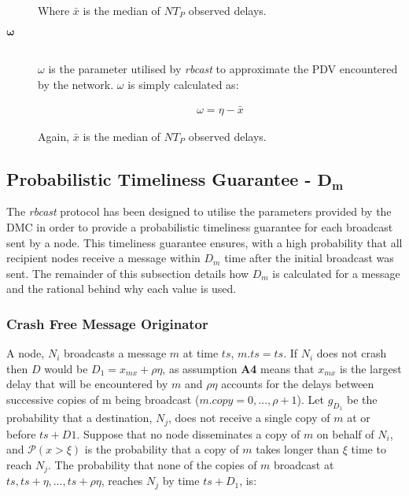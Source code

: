 \begin{description}
Where $\bar{x}$ is the median of $NT_P$ observed delays.

        \item[\Huge$\boldsymbol{\omega}$] \hfill \\
        $\omega$ is the parameter utilised by \emph{rbcast} to approximate the PDV encountered by the network.  $\omega$ is simply calculated as:
        
        \begin{equation*}
		    \begin{aligned}
		        \omega = \eta - \bar{x}
		    \end{aligned}
		\end{equation*}        
        
        Again, $\bar{x}$ is the median of $NT_P$ observed delays.
        \end{description}

        \subsection*{Probabilistic Timeliness Guarantee - $\boldsymbol{D_m}$}
        The \emph{rbcast} protocol has been designed to utilise the parameters provided by the DMC in order to provide a probabilistic timeliness guarantee for each broadcast sent by a node.  This timeliness guarantee ensures, with a high probability that all recipient nodes receive a message within $D_m$ time after the initial broadcast was sent.  The remainder of this subsection details how $D_m$ is calculated for a message and the rational behind why each value is used.  

        \subsubsection*{Crash Free Message Originator}
        A node, $N_i$ broadcasts a message $m$ at time $ts$, $m.ts = ts$.  If $N_i$ does not crash then $D$ would be $D_1 = x_{mx} + \rho\eta$, as assumption \textbf{A4} means that $x_{mx}$ is the largest delay that will be encountered by $m$ and $\rho\eta$ accounts for the delays between successive copies of m being broadcast ($m.copy = 0,\ldots,\rho+1$).  Let $g_{D_1}$ be the probability that a destination, $N_j$, does not receive a single copy of $m$ at or before $ts + D1$.  Suppose that no node disseminates a copy of $m$ on behalf of $N_i$, and $\mathcal{P}(x > \xi)$ is the probability that a copy of $m$ takes longer than $\xi$ time to reach $N_{j}$.  The probability that none of the copies of $m$ broadcast at $ts, ts+\eta, \ldots,  ts+\rho \eta$, reaches $N_{j}$ by time $ts+D_1$, is:
        
